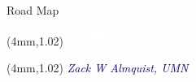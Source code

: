 \documentclass[10pt]{beamer}
\newcommand{\darkblue}[1]{{\textcolor{darkblue}{#1}}}
\begin{document}
\begin{frame}[t]{Road Map}
\begin{textblock*}{100mm}(4mm,1.02\textheight)
\includegraphics[width=20mm,height=5mm ]{graphics/white.png}
\end{textblock*}

\begin{textblock*}{100mm}(4mm,1.02\textheight)
\emph{\tiny{\darkblue{Zack W Almquist, UMN}}}
\end{textblock*}

\end{frame}
\end{document}
